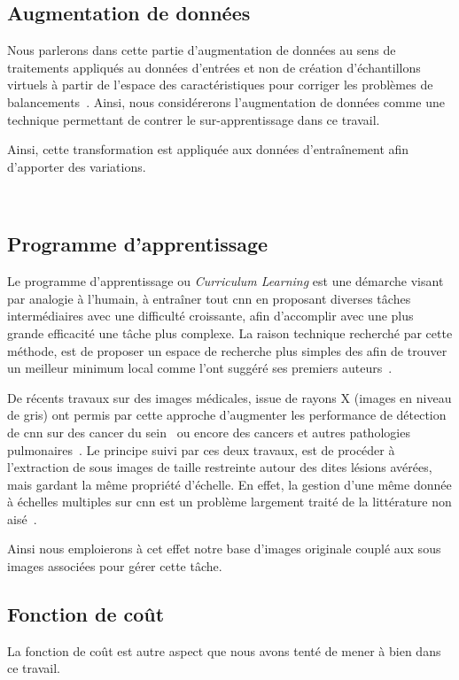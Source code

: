 \subsection{Augmentation de données}
Nous parlerons dans cette partie d'augmentation de données au sens de traitements appliqués au données d'entrées et non de création d'échantillons virtuels à partir de l'espace des caractéristiques pour corriger les problèmes de balancements~\cite{Wong2016}. Ainsi, nous considérerons l'augmentation de données comme une technique permettant de contrer le sur-apprentissage dans ce travail.\par


Ainsi, cette transformation est appliquée aux données d'entraînement afin d'apporter des variations.\par

~\cite{taylor2018}
\subsection{Programme d'apprentissage}
Le programme d'apprentissage ou \textit{Curriculum Learning} est une démarche visant par analogie à l'humain, à entraîner tout \gls{cnn} en proposant diverses tâches intermédiaires avec une difficulté croissante, afin d'accomplir avec une plus grande efficacité une tâche plus complexe. La raison technique recherché par cette méthode, est de proposer un espace de recherche plus simples des afin de trouver un meilleur minimum local comme l'ont suggéré ses premiers auteurs~\cite{Bengio2009}.\par

De récents travaux sur des images médicales, issue de rayons X (images en niveau de gris) ont permis par cette approche d'augmenter les performance de détection de \gls{cnn} sur des cancer du sein~\cite{Lotter2017} ou encore des cancers et autres pathologies pulmonaires~\cite{Park2019}. Le principe suivi par ces deux travaux, est de procéder à l'extraction de sous images de taille restreinte autour des dites lésions avérées, mais gardant la même propriété d'échelle. En effet, la gestion d'une même donnée à échelles multiples sur \gls{cnn} est un problème largement traité de la littérature non aisé~\cite{Noord2017}.\par

Ainsi nous emploierons à cet effet notre base d'images originale couplé aux sous images associées pour gérer cette tâche.\par

\subsection{Fonction de coût}
La fonction de coût est autre aspect que nous avons tenté de mener à bien dans ce travail.
~\cite{Park2019}
~\cite{Barbu2018}

